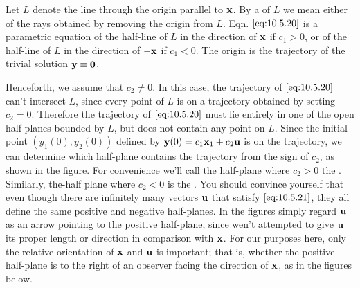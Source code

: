 \documentclass{ximera}
\begin{document}


Let $L$ denote the line through the origin parallel to ${\bf x}$. By a
 of $L$ we mean either of the rays obtained by
removing the origin from $L$. Eqn. $\eqref{eq:10.5.20}$ is a parametric
equation of the half-line of $L$ in the direction of ${\bf x}$ if
$c_1>0$, or of the half-line of $L$ in the direction of $-{\bf x}$ if
$c_1<0$. The origin is the trajectory of the trivial solution ${\bf
y}\equiv{\bf 0}$.

Henceforth, we assume that $c_2\neq0$. In this case, the trajectory of
$\eqref{eq:10.5.20}$ can't intersect $L$, since every point of $L$ is on a
trajectory obtained by setting $c_2=0$. Therefore the trajectory of
$\eqref{eq:10.5.20}$ must lie entirely in one of the open half-planes
bounded
by $L$, but does not contain any point on $L$. Since the initial point
$(y_1(0),y_2(0))$ defined by ${\bf y}(0)=c_1{\bf x}_1+c_2{\bf u}$ is
on the trajectory, we can determine which half-plane contains the
trajectory from the sign of $c_2$, as shown in
the figure.
For convenience we'll call the half-plane where $c_2>0$ the
. Similarly, the-half plane where $c_2<0$ is
the . You should convince yourself %
that even though there are infinitely
many vectors ${\bf u}$ that satisfy $\eqref{eq:10.5.21}$, they all define
the same positive and negative half-planes. In the figures simply
regard ${\bf u}$ as an arrow pointing to the positive half-plane,
since wen't attempted to give ${\bf u}$ its proper length or
direction in comparison with ${\bf x}$. For our purposes here, only the
relative orientation of ${\bf x}$ and ${\bf u}$ is important; that is,
whether the positive half-plane is to the right of an observer facing
the direction of ${\bf x}$, as in the figures below.

\begin{center}
\end{center}

\begin{center}
\end{center}

\end{document}
